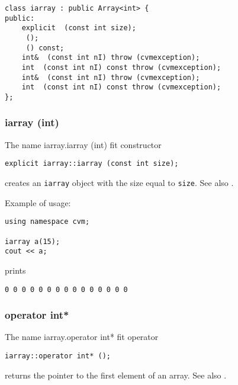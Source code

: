 \bigskip
\noindent
\verb"class iarray : public Array<int> {"\\
\verb"public:"\\
\verb"    explicit "\verb" (const int size);"\\
\verb"    "\verb" ();"\\
\verb"    "\verb" () const;"\\
\verb"    int& "\verb" (const int nI) throw (cvmexception);"\\
\verb"    int "\verb" (const int nI) const throw (cvmexception);"\\
\verb"    int& "\verb" (const int nI) throw (cvmexception);"\\
\verb"    int "\verb" (const int nI) const throw (cvmexception);"\\
\verb"};"
\newpage





\subsubsection{iarray (int)}
The%
\pdfdest name {iarray.iarray (int)} fit
constructor
\begin{verbatim}
explicit iarray::iarray (const int size);
\end{verbatim}
creates an \verb"iarray" object with the size equal to \verb"size".
See also .

Example of usage:
\begin{verbatim}
using namespace cvm;

iarray a(15);
cout << a;
\end{verbatim}
prints
\begin{verbatim}
0 0 0 0 0 0 0 0 0 0 0 0 0 0 0
\end{verbatim}
\newpage


\subsubsection{operator int*}
The%
\pdfdest name {iarray.operator int*} fit
operator
\begin{verbatim}
iarray::operator int* ();
\end{verbatim}
returns the pointer to the first element of an array.
See also .

